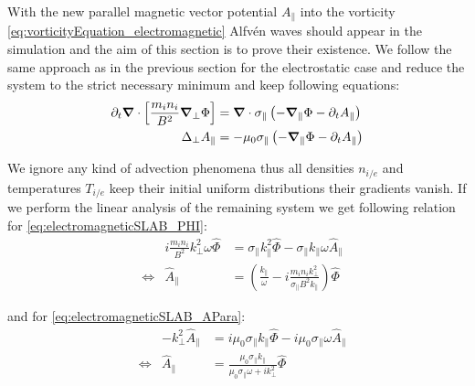 With the new parallel magnetic vector potential $A_\parallel$ into the vorticity \autoref{eq:vorticityEquation_electromagnetic} Alfvén waves should appear in the simulation and the aim of this section is to prove their existence. We follow the same approach as in the previous section for the electrostatic case and reduce the system to the strict necessary minimum and keep following equations: 
\begin{align}
	\partial_t\grad\cdot\left[\frac{m_in_i}{B^2}\grad_\perp\Phi\right] &= \grad\cdot\sigma_\parallel\left(-\grad_\parallel\Phi-\partial_tA_\parallel\right) \label{eq:electromagneticSLAB_PHI} \\
	\Delta_{\perp}A_\parallel &= -\mu_0\sigma_\parallel\left(-\grad_\parallel\Phi-\partial_tA_\parallel\right) \label{eq:electromagneticSLAB_APara}
\end{align}

We ignore any kind of advection phenomena thus all densities $n_{i/e}$ and temperatures $T_{i/e}$ keep their initial uniform distributions their gradients vanish. If we perform the linear analysis of the remaining system we get following relation for \autoref{eq:electromagneticSLAB_PHI}:
\begin{align*}
	&&i\frac{m_in_i}{B^2}k_\perp^2\omega\hat{\Phi} &= \sigma_\parallel k_\parallel^2\hat{\Phi}-\sigma_\parallel k_\parallel\omega\hat{A}_\parallel \\
	&\Leftrightarrow& \hat{A}_\parallel &= \left(\frac{k_\parallel}{\omega} - i\frac{m_in_ik_\perp^2}{\sigma_\parallel B^2k_\parallel}\right)\hat{\Phi}
\end{align*}

and for \autoref{eq:electromagneticSLAB_APara}:
\begin{align*}
	&&-k_\perp^2\hat{A}_\parallel &= i\mu_0\sigma_\parallel k_\parallel\hat{\Phi} - i\mu_0\sigma_\parallel\omega\hat{A}_\parallel \\
	&\Leftrightarrow&\hat{A}_\parallel &= \frac{\mu_0\sigma_\parallel k_\parallel}{\mu_0\sigma_\parallel\omega + i k_\perp^2}\hat{\Phi}
\end{align*}

